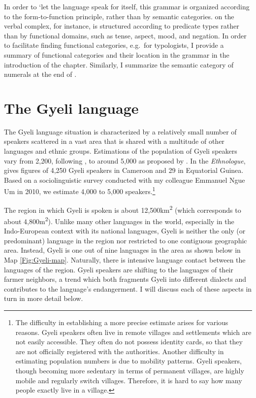 In order to `let the language speak for itself, this grammar is organized according to the form-to-function principle, rather than by semantic categories.  on the verbal complex, for instance, is structured according to predicate types rather than by functional domains, such as tense, aspect, mood, and negation. In order  to facilitate finding functional categories, e.g.\ for typologists, I provide a summary of functional categories and their location in the grammar in the introduction of the chapter. Similarly, I summarize the semantic category of numerals at the end of .


 


\section{The Gyeli language}
\label{sec:Gyeli}

The Gyeli language situation is characterized by a relatively small number of  speakers scattered in a vast area that is shared with a multitude of other languages and ethnic groups.
Estimations of the population of Gyeli speakers vary from 2,200, following \citet[27]{renaud76}, to around 5,000 as proposed by \citet[215]{ngima2001}. In the \textit{Ethnologue}, \citet{lewis09} gives figures of 4,250 Gyeli speakers in Cameroon and 29 in Equatorial Guinea. Based on a sociolinguistic survey conducted with my colleague Emmanuel Ngue Um in 2010,  we estimate 4,000 to 5,000 speakers.\footnote{The difficulty in establishing a more precise estimate arises for various reasons. Gyeli speakers often live in remote villages and settlements which are not easily accessible. They often do not possess identity cards, so that they are not officially registered with the authorities. Another difficulty in estimating population numbers is due to mobility patterns. Gyeli speakers, though becoming more sedentary in terms of permanent villages, are highly mobile and regularly switch villages. Therefore, it is hard to say how many people exactly live in a village.}

The region in which Gyeli is spoken is about 12,500km\textsuperscript{2} (which corresponds to about 4,800m\textsuperscript{2}). Unlike many other languages in the world, especially in the Indo-European context with its national languages, Gyeli is neither the only (or predominant) language in the region nor restricted to one contiguous geographic area. Instead, Gyeli is one out of nine languages in the area as shown below in Map \ref{Fig:Gyeli-map}.  Naturally, there is intensive language contact between the languages of the region. Gyeli speakers are shifting to the languages of their farmer neighbors, a trend which both fragments Gyeli into different dialects and contributes to the language's endangerment.  I will discuss each of these aspects in turn in more detail below.


